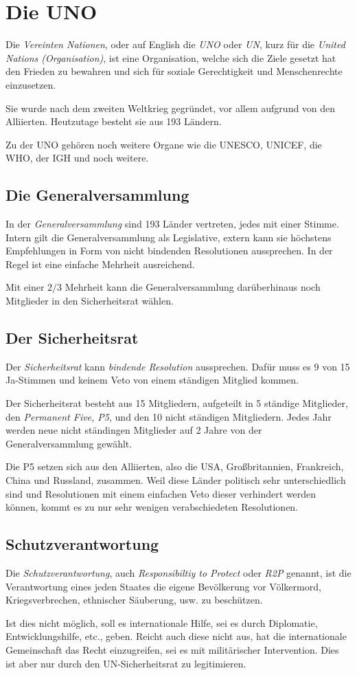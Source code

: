 \documentclass{article}
\begin{document}
\section{Die UNO}
Die \emph{Vereinten Nationen}, oder auf English die \emph{UNO} oder \emph{UN}, kurz für die \emph{United Nations (Organisation)}, ist eine Organisation, welche sich die Ziele gesetzt hat den Frieden zu bewahren und sich für soziale Gerechtigkeit und Menschenrechte einzusetzen.
 
Sie wurde nach dem zweiten Weltkrieg gegründet, vor allem aufgrund von den Alliierten. Heutzutage besteht sie aus 193 Ländern. 
 
Zu der UNO gehören noch weitere Organe wie die UNESCO, UNICEF, die WHO, der IGH und noch weitere.
 
\subsection{Die Generalversammlung}
In der \emph{Generalversammlung} sind 193 Länder vertreten, jedes mit einer Stimme. Intern gilt die Generalversammlung als Legislative, extern kann sie höchstens Empfehlungen in Form von nicht bindenden Resolutionen aussprechen. In der Regel ist eine einfache Mehrheit ausreichend.
 
Mit einer $2/3$ Mehrheit kann die Generalversammlung darüberhinaus noch Mitglieder in den Sicherheitsrat wählen. 
 
\subsection{Der Sicherheitsrat}
Der \emph{Sicherheitsrat} kann \emph{bindende Resolution} aussprechen. Dafür muss es 9 von 15 Ja-Stimmen und keinem Veto von einem ständigen Mitglied kommen.
 
Der Sicherheitsrat besteht aus 15 Mitgliedern, aufgeteilt in 5 ständige Mitglieder, den \emph{Permanent Five, P5}, und den 10 nicht ständigen Mitgliedern. Jedes Jahr werden neue nicht ständingen Mitglieder auf 2 Jahre von der Generalversammlung gewählt.
 
Die P5 setzen sich aus den Alliierten, also die USA, Großbritannien, Frankreich, China und Russland, zusammen. Weil diese Länder politisch sehr unterschiedlich sind und Resolutionen mit einem einfachen Veto dieser verhindert werden können, kommt es zu nur sehr wenigen verabschiedeten Resolutionen.
 
\subsection{Schutzverantwortung}
Die \emph{Schutzverantwortung}, auch \emph{Responsibiltiy to Protect} oder \emph{R2P} genannt, ist die Verantwortung eines jeden Staates die eigene Bevölkerung vor Völkermord, Kriegsverbrechen, ethnischer Säuberung, usw. zu beschützen.
 
Ist dies nicht möglich, soll es internationale Hilfe, sei es durch Diplomatie, Entwicklungshilfe, etc., geben. Reicht auch diese nicht aus, hat die internationale Gemeinschaft das Recht einzugreifen, sei es mit militärischer Intervention. Dies ist aber nur durch den UN-Sicherheitsrat zu legitimieren.
\end{document}
